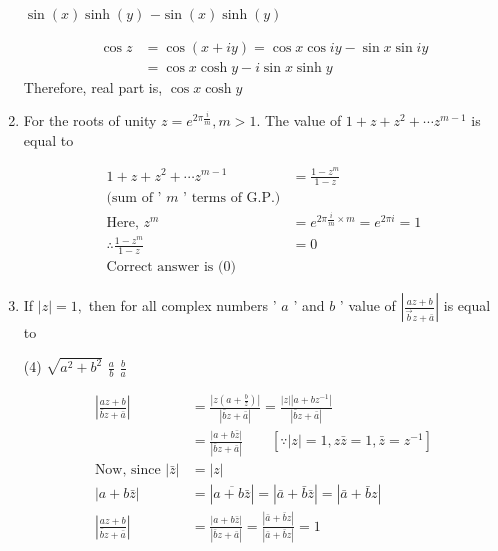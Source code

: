 \begin{enumerate}[label=\color{ocre}\textbf{\arabic*.}]
\begin{tasks}
	\task[\textbf{c.}] $\sin (x) \sinh (y)$ 
	\task[\textbf{d.}]$-\sin (x) \sinh (y)$ 
\end{tasks}
\begin{answer}
	\begin{align*}
	\cos z&=\cos (x+i y)=\cos x \cos i y-\sin x \sin i y\\&=\cos x \cosh y-i \sin x \sinh y
	\end{align*}
Therefore, real part is, $\cos x \cosh y$
\end{answer}
\item For the roots of unity $z=e^{2 \pi \frac{i}{m}}, m>1$. The value of $1+z+z^{2}+\cdots z^{m-1}$ is equal to
\begin{answer}
	\begin{align*}
1+z+z^{2}+\cdots z^{m-1}&=\frac{1-z^{m}}{1-z}\\\text{(sum of ' $m$ ' terms of G.P.)}\\
\text{Here, }z^{m}&=e^{2 \pi \frac{i}{m} \times m}=e^{2 \pi i}=1\\
\therefore \frac{1-z^{m}}{1-z}&=0
\\\text{Correct answer is (0)}
\end{align*}
\end{answer}
\item If $|z|=1,$ then for all complex numbers ' $a$ ' and $b$ ' value of $\left|\frac{a z+b}{\vec{b} z+\bar{a}}\right|$ is equal to
\begin{tasks}(4)
	\task[\textbf{a.}]$\sqrt{a^{2}+b^{2}}$  
	\task[\textbf{c.}] $\frac{a}{b}$
    \task[\textbf{d.}]$\frac{b}{a}$  
\end{tasks}
\begin{answer}
	\begin{align*}
	\left|\frac{a z+b}{\bar{b} z+\bar{a}}\right|&=\frac{\left|z\left(a+\frac{b}{z}\right)\right|}{|\bar{b} z+\bar{a}|}=\frac{|z|\left|a+b z^{-1}\right|}{|\bar{b} z+\bar{a}|}\\&=\frac{|a+b \bar{z}|}{|\bar{b} z+\bar{a}|} \qquad\left[\because|z|=1, z \bar{z}=1, \bar{z}=z^{-1}\right]\\
	\text{Now, since }|\bar{z}|&=|z|\\
	|a+b \bar{z}|&=|\overline{a+b \bar{z}}|=|\bar{a}+\bar{b} \bar{z}|=|\bar{a}+\bar{b} z| \\
	\left|\frac{a z+b}{\bar{b} z+\bar{a}}\right|&=\frac{|a+b \bar{z}|}{|\bar{b} z+\bar{a}|}=\frac{|\bar{a}+\bar{b} z|}{|\bar{a}+\bar{b} z|}=1
	\end{align*}
	
	
\end{answer}
\end{enumerate}

